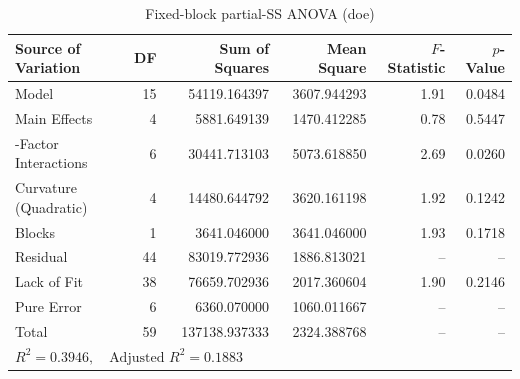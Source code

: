 \begin{table}[htbp]
\centering
\caption{Fixed-block partial-SS ANOVA (doe)}
\label{tab:anova_0_doe_latency_us}
\begin{tabular}{lrrrrr}
\hline
\textbf{Source of Variation} & \textbf{DF} & \textbf{Sum of Squares} & \textbf{Mean Square} & \textbf{$F$-Statistic} & \textbf{$p$-Value} \\
\hline
Model & 15 & 54119.164397 & 3607.944293 & 1.91 & 0.0484 \\
\quad Main Effects & 4 & 5881.649139 & 1470.412285 & 0.78 & 0.5447 \\
\quad 2-Factor Interactions & 6 & 30441.713103 & 5073.618850 & 2.69 & 0.0260 \\
\quad Curvature (Quadratic) & 4 & 14480.644792 & 3620.161198 & 1.92 & 0.1242 \\
\quad Blocks & 1 & 3641.046000 & 3641.046000 & 1.93 & 0.1718 \\
Residual & 44 & 83019.772936 & 1886.813021 & -- & -- \\
\quad Lack of Fit & 38 & 76659.702936 & 2017.360604 & 1.90 & 0.2146 \\
\quad Pure Error & 6 & 6360.070000 & 1060.011667 & -- & -- \\
Total & 59 & 137138.937333 & 2324.388768 & -- & -- \\
\hline
\multicolumn{6}{l}{\small $R^2 = 0.3946, \quad \text{Adjusted } R^2 = 0.1883$} \\
\hline
\end{tabular}
\end{table}